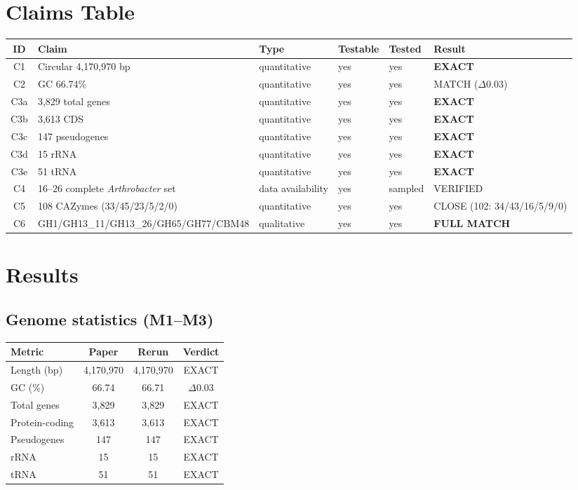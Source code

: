\documentclass[11pt]{article}
\begin{document}
\section{Claims Table}
\begin{longtable}{@{}clllll@{}}
\toprule
ID & Claim & Type & Testable & Tested & Result \\
\midrule
C1  & Circular 4{,}170{,}970 bp                & quantitative & yes & yes & \textbf{EXACT} \\
C2  & GC 66.74\%                                & quantitative & yes & yes & MATCH ($\Delta$0.03) \\
C3a & 3{,}829 total genes                       & quantitative & yes & yes & \textbf{EXACT} \\
C3b & 3{,}613 CDS                               & quantitative & yes & yes & \textbf{EXACT} \\
C3c & 147 pseudogenes                           & quantitative & yes & yes & \textbf{EXACT} \\
C3d & 15 rRNA                                   & quantitative & yes & yes & \textbf{EXACT} \\
C3e & 51 tRNA                                   & quantitative & yes & yes & \textbf{EXACT} \\
C4  & 16--26 complete \emph{Arthrobacter} set    & data availability & yes & sampled & VERIFIED \\
C5  & 108 CAZymes (33/45/23/5/2/0)              & quantitative & yes & yes & CLOSE (102: 34/43/16/5/9/0) \\
C6  & GH1/GH13\_11/GH13\_26/GH65/GH77/CBM48     & qualitative  & yes & yes & \textbf{FULL MATCH} \\
\bottomrule
\end{longtable}

\section{Results}

\subsection{Genome statistics (M1--M3)}
\begin{tabular}{@{}lccc@{}}
\toprule
Metric & Paper & Rerun & Verdict \\
\midrule
Length (bp)    & 4{,}170{,}970 & 4{,}170{,}970 & EXACT \\
GC (\%)        & 66.74         & 66.71         & $\Delta$0.03 \\
Total genes    & 3{,}829       & 3{,}829       & EXACT \\
Protein-coding & 3{,}613       & 3{,}613       & EXACT \\
Pseudogenes    & 147           & 147           & EXACT \\
rRNA           & 15            & 15            & EXACT \\
tRNA           & 51            & 51            & EXACT \\
\bottomrule
\end{tabular}
\end{document}
